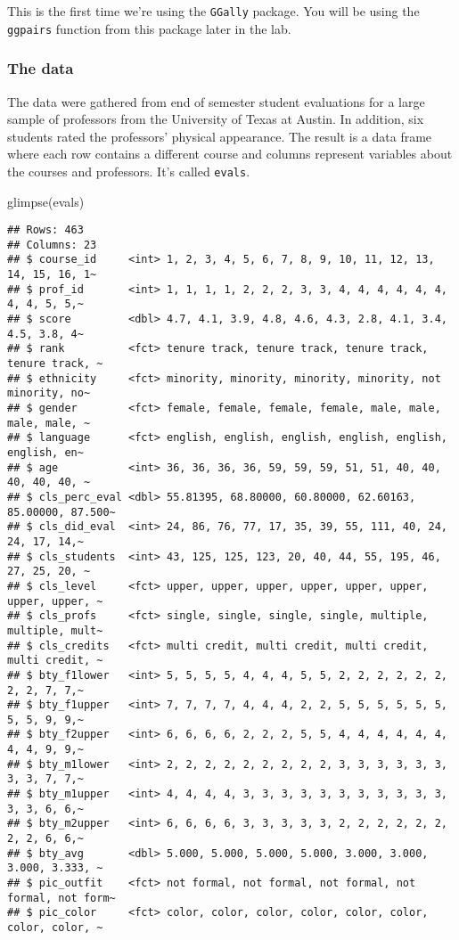 \documentclass[
]{article}
\newenvironment{Shaded}{\begin{snugshade}}{\end{snugshade}}
\newcommand{\FunctionTok}[1]{\textcolor[rgb]{0.00,0.00,0.00}{#1}}
\newcommand{\NormalTok}[1]{#1}
\begin{document}
This is the first time we're using the \texttt{GGally} package. You will
be using the \texttt{ggpairs} function from this package later in the
lab.

\hypertarget{the-data}{%
\subsubsection{The data}\label{the-data}}

The data were gathered from end of semester student evaluations for a
large sample of professors from the University of Texas at Austin. In
addition, six students rated the professors' physical appearance. The
result is a data frame where each row contains a different course and
columns represent variables about the courses and professors. It's
called \texttt{evals}.

\begin{Shaded}
\begin{Highlighting}[]
\FunctionTok{glimpse}\NormalTok{(evals)}
\end{Highlighting}
\end{Shaded}

\begin{verbatim}
## Rows: 463
## Columns: 23
## $ course_id     <int> 1, 2, 3, 4, 5, 6, 7, 8, 9, 10, 11, 12, 13, 14, 15, 16, 1~
## $ prof_id       <int> 1, 1, 1, 1, 2, 2, 2, 3, 3, 4, 4, 4, 4, 4, 4, 4, 4, 5, 5,~
## $ score         <dbl> 4.7, 4.1, 3.9, 4.8, 4.6, 4.3, 2.8, 4.1, 3.4, 4.5, 3.8, 4~
## $ rank          <fct> tenure track, tenure track, tenure track, tenure track, ~
## $ ethnicity     <fct> minority, minority, minority, minority, not minority, no~
## $ gender        <fct> female, female, female, female, male, male, male, male, ~
## $ language      <fct> english, english, english, english, english, english, en~
## $ age           <int> 36, 36, 36, 36, 59, 59, 59, 51, 51, 40, 40, 40, 40, 40, ~
## $ cls_perc_eval <dbl> 55.81395, 68.80000, 60.80000, 62.60163, 85.00000, 87.500~
## $ cls_did_eval  <int> 24, 86, 76, 77, 17, 35, 39, 55, 111, 40, 24, 24, 17, 14,~
## $ cls_students  <int> 43, 125, 125, 123, 20, 40, 44, 55, 195, 46, 27, 25, 20, ~
## $ cls_level     <fct> upper, upper, upper, upper, upper, upper, upper, upper, ~
## $ cls_profs     <fct> single, single, single, single, multiple, multiple, mult~
## $ cls_credits   <fct> multi credit, multi credit, multi credit, multi credit, ~
## $ bty_f1lower   <int> 5, 5, 5, 5, 4, 4, 4, 5, 5, 2, 2, 2, 2, 2, 2, 2, 2, 7, 7,~
## $ bty_f1upper   <int> 7, 7, 7, 7, 4, 4, 4, 2, 2, 5, 5, 5, 5, 5, 5, 5, 5, 9, 9,~
## $ bty_f2upper   <int> 6, 6, 6, 6, 2, 2, 2, 5, 5, 4, 4, 4, 4, 4, 4, 4, 4, 9, 9,~
## $ bty_m1lower   <int> 2, 2, 2, 2, 2, 2, 2, 2, 2, 3, 3, 3, 3, 3, 3, 3, 3, 7, 7,~
## $ bty_m1upper   <int> 4, 4, 4, 4, 3, 3, 3, 3, 3, 3, 3, 3, 3, 3, 3, 3, 3, 6, 6,~
## $ bty_m2upper   <int> 6, 6, 6, 6, 3, 3, 3, 3, 3, 2, 2, 2, 2, 2, 2, 2, 2, 6, 6,~
## $ bty_avg       <dbl> 5.000, 5.000, 5.000, 5.000, 3.000, 3.000, 3.000, 3.333, ~
## $ pic_outfit    <fct> not formal, not formal, not formal, not formal, not form~
## $ pic_color     <fct> color, color, color, color, color, color, color, color, ~
\end{verbatim}
\end{document}

